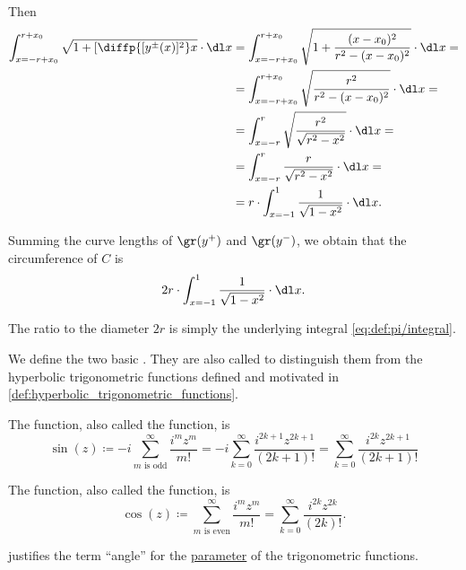 \begin{defproof}
  Then
  \begin{align*}
    \int_{x=-r + x_0}^{r + x_0} \sqrt{ 1 + [\diffp {[y^\pm(x)]^2} x } \cdot \dl x
    &=
    \int_{x=-r + x_0}^{r + x_0} \sqrt{ 1 + \frac {(x - x_0)^2} { r^2 - (x - x_0)^2 } } \cdot \dl x
    = \\ &=
    \int_{x=-r + x_0}^{r + x_0} \sqrt{ \frac {r^2} { r^2 - (x - x_0)^2 } } \cdot \dl x
    = \\ &=
    \int_{x=-r}^r \sqrt{ \frac {r^2} { \sqrt{r^2 - x^2} } } \cdot \dl x
    = \\ &=
    \int_{x=-r}^r \frac r { \sqrt{r^2 - x^2} } \cdot \dl x
    = \\ &=
    r \cdot \int_{x=-1}^1 \frac 1 { \sqrt{1 - x^2} } \cdot \dl x.
  \end{align*}

  Summing the curve lengths of \( \gr(y^+) \) and \( \gr(y^-) \), we obtain that the circumference of \( C \) is
  \begin{equation*}
    2r \cdot \int_{x=-1}^1 \frac 1 { \sqrt{1 - x^2} } \cdot \dl x.
  \end{equation*}

  The ratio to the diameter \( 2r \) is simply the underlying integral \eqref{eq:def:pi/integral}.
\end{defproof}

\begin{definition}\label{def:trigonometric_functions}
  We define the two basic . They are also called  to distinguish them from the hyperbolic trigonometric functions defined and motivated in \cref{def:hyperbolic_trigonometric_functions}.

  \begin{thmenum}
     The  function, also called the  function, is
    \begin{equation*}
      \sin(z)
      \coloneqq
      -i \sum_{m \text{ is odd}}^\infty \frac {i^m z^m} {m!}
      =
      -i \sum_{k=0}^\infty \frac {i^{2k+1} z^{2k+1}} {(2k + 1)!}
      =
      \sum_{k=0}^\infty \frac {i^{2k} z^{2k+1}} {(2k + 1)!}
    \end{equation*}

     The  function, also called the  function, is
    \begin{equation*}
      \cos(z)
      \coloneqq
      \sum_{m \text{ is even}}^\infty \frac {i^m z^m} {m!}
      =
      \sum_{k=0}^\infty \frac {i^{2k} z^{2k}} {(2k)!}.
    \end{equation*}
  \end{thmenum}

   justifies the term \enquote{angle} for the \hyperref[con:function_arguments]{parameter} of the trigonometric functions.
\end{definition}

